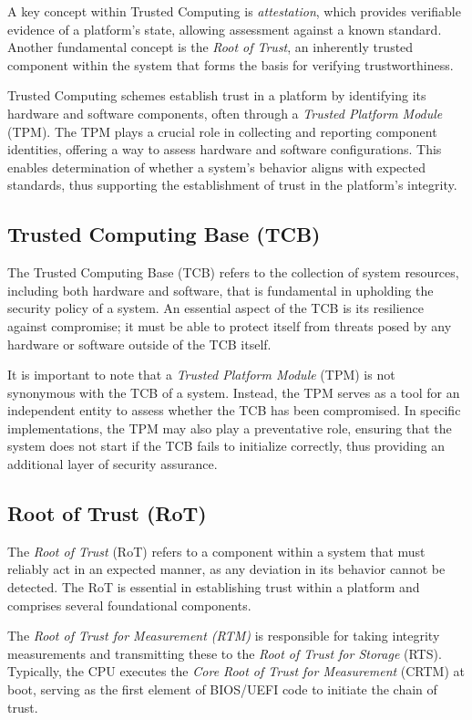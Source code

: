 A key concept within Trusted Computing is \textit{attestation}, which 
provides verifiable evidence of a platform’s state, allowing assessment 
against a known standard. Another fundamental concept is the 
\textit{Root of Trust}, an inherently trusted component within the 
system that forms the basis for verifying trustworthiness.

Trusted Computing schemes establish trust in a platform by 
identifying its hardware and software components, often through 
a \textit{Trusted Platform Module} (TPM). The TPM plays a crucial 
role in collecting and reporting component identities, offering a way 
to assess hardware and software configurations. This enables 
determination of whether a system’s behavior aligns with expected 
standards, thus supporting the establishment of trust in the platform’s 
integrity.

\subsection{Trusted Computing Base (TCB)}

The Trusted Computing Base (TCB) refers to the collection of 
system resources, including both hardware and software, that is 
fundamental in upholding the security policy of a system. An essential 
aspect of the TCB is its resilience against compromise; it must be 
able to protect itself from threats posed by any hardware or software 
outside of the TCB itself.

It is important to note that a \textit{Trusted Platform Module} (TPM) 
is not synonymous with the TCB of a system. Instead, the TPM 
serves as a tool for an independent entity to assess whether the 
TCB has been compromised. In specific implementations, the TPM 
may also play a preventative role, ensuring that the system does 
not start if the TCB fails to initialize correctly, thus providing an 
additional layer of security assurance.

\subsection{Root of Trust (RoT)}

The \textit{Root of Trust} (RoT) refers to a component within a system 
that must reliably act in an expected manner, as any deviation in its 
behavior cannot be detected. The RoT is essential in establishing trust 
within a platform and comprises several foundational components.

The \textit{Root of Trust for Measurement (RTM)} is responsible for 
taking integrity measurements and transmitting these to the 
\textit{Root of Trust for Storage} (RTS). Typically, the CPU executes 
the \textit{Core Root of Trust for Measurement} (CRTM) at boot, 
serving as the first element of BIOS/UEFI code to initiate the 
chain of trust.

